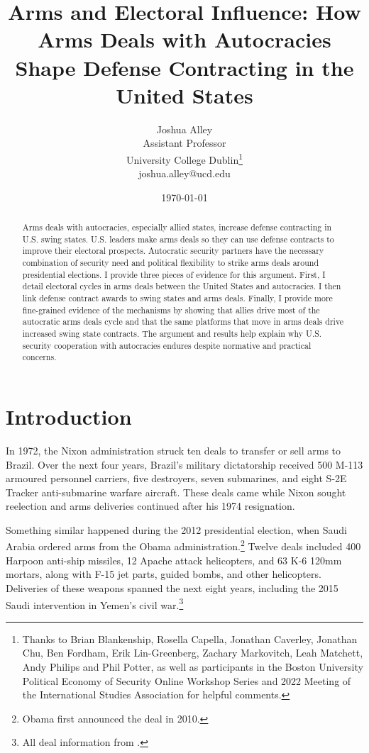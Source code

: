 \documentclass[12pt]{article}
\title{\textbf{Arms and Electoral Influence: How Arms Deals with Autocracies Shape Defense Contracting in the United States}}
\author{Joshua Alley \\
Assistant Professor \\
University College Dublin\thanks{Thanks to Brian Blankenship, Rosella Capella, Jonathan Caverley, Jonathan Chu, Ben Fordham, Erik Lin-Greenberg, Zachary Markovitch, Leah Matchett, Andy Philips and Phil Potter, as well as participants in the Boston University Political Economy of Security Online Workshop Series and 2022 Meeting of the International Studies Association for helpful comments.} \\
joshua.alley@ucd.edu
}
\date{\today}
\begin{document}
\maketitle 

\begin{abstract} 
Arms deals with autocracies, especially allied states, increase defense contracting in U.S. swing states. 
U.S. leaders make arms deals so they can use defense contracts to improve their electoral prospects.
Autocratic security partners have the necessary combination of security need and political flexibility to strike arms deals around presidential elections. 
I provide three pieces of evidence for this argument.  
First, I detail electoral cycles in arms deals between the United States and autocracies. 
I then link defense contract awards to swing states and arms deals.
Finally, I provide more fine-grained evidence of the mechanisms by showing that allies drive most of the autocratic arms deals cycle and that the same platforms that move in arms deals drive increased swing state contracts.  
The argument and results help explain why U.S. security cooperation with autocracies endures despite normative and practical concerns.
\end{abstract} 


\newpage 
\doublespace 


\section{Introduction}



In 1972, the Nixon administration struck ten deals to transfer or sell arms to Brazil.
Over the next four years, Brazil's military dictatorship received 500 M-113 armoured personnel carriers, five destroyers, seven submarines, and eight S-2E Tracker anti-submarine warfare aircraft.
These deals came while Nixon sought reelection and arms deliveries continued after his 1974 resignation. 


Something similar happened during the 2012 presidential election, when Saudi Arabia ordered arms from the Obama administration.\footnote{Obama first announced the deal in 2010.} 
Twelve deals included 400 Harpoon anti-ship missiles, 12 Apache attack helicopters, and 63 K-6 120mm mortars, along with F-15 jet parts, guided bombs, and other helicopters. 
Deliveries of these weapons spanned the next eight years, including the 2015 Saudi intervention in Yemen's civil war.\footnote{All deal information from \citep{SIPRI2021}.}
\end{document}
